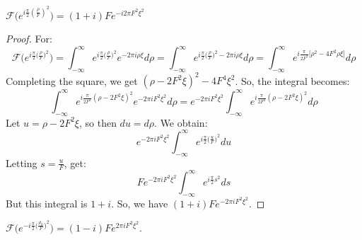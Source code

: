 \documentclass[crop=false,class=book,oneside]{standalone}
\begin{document}
            \begin{theorem}
                $\mathcal{F}\big(e^{i\frac{\pi}{2}(\frac{\rho}{F})^2}\big) = (1+i)Fe^{-i2\pi F^2 \xi^2}$
            \end{theorem}
            \begin{proof}
            For:
            \begin{equation*}
                \mathcal{F}\big(e^{i\frac{\pi}{2} \big(\frac{\rho}{F}\big)^2}\big) = \int_{-\infty}^{\infty} e^{i\frac{\pi}{2}\big(\frac{\rho}{F}\big)^2}e^{-2\pi i \rho \xi}d\rho = \int_{-\infty}^{\infty} e^{i\frac{\pi}{2}\big(\frac{\rho}{F}\big)^2-2\pi i \rho \xi}d\rho = \int_{-\infty}^{\infty} e^{i\frac{\pi}{2F^2}\big[\rho^2-4F^2\rho \xi\big]}d\rho    
            \end{equation*}
            Completing the square, we get $(\rho - 2F^2 \xi)^2 - 4F^4\xi^2$. So, the integral becomes:
            \begin{equation*}
                \int_{-\infty}^{\infty} e^{i\frac{\pi}{2F^2}(\rho - 2F^2\xi)^2}e^{-2\pi i F^2 \xi^2}d\rho = e^{-2\pi i F^2 \xi^2}\int_{-\infty}^{\infty} e^{i\frac{\pi}{2F^2}(\rho - 2F^2\xi)^2}d\rho
            \end{equation*}
            Let $u = \rho - 2F^2\xi$, so then $du = d\rho$. We obtain:
            \begin{equation*}
                e^{-2\pi i F^2 \xi^2}\int_{-\infty}^{\infty} e^{i\frac{\pi}{2}\big(\frac{u}{F}\big)^2}du
            \end{equation*}
            Letting $s = \frac{u}{F}$, get:
            \begin{equation*}
            Fe^{-2\pi i F^2 \xi^2} \int_{-\infty}^{\infty} e^{i\frac{\pi}{2}s^2}ds
            \end{equation*}
            But this integral is $1+i$. So, we have $(1+i)Fe^{-2\pi i F^2 \xi^2}$.
            \end{proof}
            \begin{theorem}
            $\mathcal{F}(e^{-i\frac{\pi}{2}\big(\frac{\rho_0}{F}\big)^2}\big) = (1-i)Fe^{2\pi i F^2 \xi^2}$.
            \end{theorem}
\end{document}
